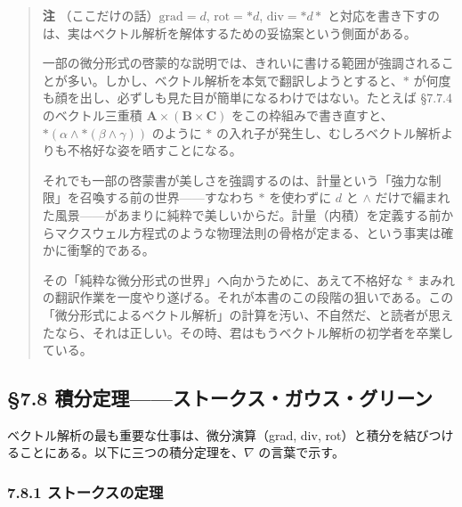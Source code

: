 \documentclass[a4paper,12pt,openany]{book}
\begin{document}
\begin{quote}
\textbf{注} （ここだけの話）\(\mathrm{grad}=d\),
\(\mathrm{rot}=\ast d\), \(\mathrm{div}=\ast d\ast\)
と対応を書き下すのは、実はベクトル解析を解体するための妥協案という側面がある。

一部の微分形式の啓蒙的な説明では、きれいに書ける範囲が強調されることが多い。しかし、ベクトル解析を本気で翻訳しようとすると、\(\ast\)
が何度も顔を出し、必ずしも見た目が簡単になるわけではない。たとえば
§7.7.4 のベクトル三重積 \(\mathbf{A}\times(\mathbf{B}\times\mathbf{C})\)
をこの枠組みで書き直すと、\(\ast(\alpha \wedge \ast(\beta \wedge \gamma))\)
のように \(\ast\)
の入れ子が発生し、むしろベクトル解析よりも不格好な姿を晒すことになる。

それでも一部の啓蒙書が美しさを強調するのは、計量という「強力な制限」を召喚する前の世界——すなわち
\(\ast\) を使わずに \(d\) と \(\wedge\)
だけで編まれた風景——があまりに純粋で美しいからだ。計量（内積）を定義する前からマクスウェル方程式のような物理法則の骨格が定まる、という事実は確かに衝撃的である。

その「純粋な微分形式の世界」へ向かうために、あえて不格好な \(\ast\)
まみれの翻訳作業を一度やり遂げる。それが本書のこの段階の狙いである。この「微分形式によるベクトル解析」の計算を汚い、不自然だ、と読者が思えたなら、それは正しい。その時、君はもうベクトル解析の初学者を卒業している。
\end{quote}

\par\vspace{0.35em}\par

\hypertarget{ux7a4dux5206ux5b9aux7406ux30b9ux30c8ux30fcux30afux30b9ux30acux30a6ux30b9ux30b0ux30eaux30fcux30f3}{%
\subsection{§7.8
積分定理——ストークス・ガウス・グリーン}\label{ux7a4dux5206ux5b9aux7406ux30b9ux30c8ux30fcux30afux30b9ux30acux30a6ux30b9ux30b0ux30eaux30fcux30f3}}

ベクトル解析の最も重要な仕事は、微分演算（grad, div,
rot）と積分を結びつけることにある。以下に三つの積分定理を、\(\nabla\)
の言葉で示す。

\hypertarget{ux30b9ux30c8ux30fcux30afux30b9ux306eux5b9aux7406}{%
\subsubsection{7.8.1
ストークスの定理}\label{ux30b9ux30c8ux30fcux30afux30b9ux306eux5b9aux7406}}
\end{document}
